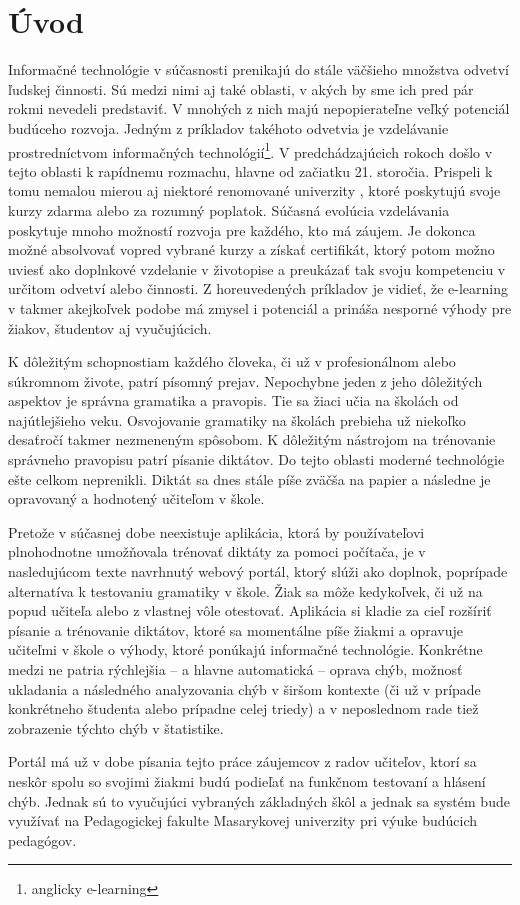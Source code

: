 \documentclass[12pt,oneside]{fithesis2}
\begin{document}
  \MainMatter                     %
\chapter{Úvod}          %
  
  \par Informačné technológie v súčasnosti prenikajú do stále väčšieho množstva odvetví ľudskej činnosti. Sú medzi nimi aj také oblasti, v akých by sme ich pred pár rokmi nevedeli predstaviť. V mnohých z nich majú nepopierateľne veľký potenciál budúceho rozvoja. Jedným z príkladov takéhoto odvetvia je vzdelávanie prostredníctvom informačných technológií\footnote{anglicky e-learning}. V predchádzajúcich rokoch došlo v tejto oblasti k rapídnemu rozmachu, hlavne od začiatku 21. storočia\cite{cross04}. Prispeli k tomu nemalou mierou aj niektoré renomované univerzity \cite{crimson15}, ktoré poskytujú svoje kurzy zdarma alebo za rozumný poplatok. Súčasná evolúcia vzdelávania poskytuje mnoho možností rozvoja pre každého, kto má záujem. Je dokonca možné absolvovať vopred vybrané kurzy a získať certifikát, ktorý potom možno uviesť ako doplnkové vzdelanie v životopise a preukázať tak svoju kompetenciu v určitom odvetví alebo činnosti\cite{coursera15}. Z horeuvedených príkladov je vidieť, že e-learning v takmer akejkoľvek podobe má zmysel i potenciál a prináša nesporné výhody pre žiakov, študentov aj vyučujúcich. 
  \par K dôležitým schopnostiam každého človeka, či už v profesionálnom alebo súkromnom živote, patrí písomný prejav. Nepochybne jeden z jeho dôležitých aspektov je správna gramatika a pravopis. Tie sa žiaci učia na školách od najútlejšieho veku. Osvojovanie gramatiky na školách prebieha už niekoľko desaťročí takmer nezmeneným spôsobom. K dôležitým nástrojom na trénovanie správneho pravopisu patrí písanie diktátov. Do tejto oblasti moderné technológie ešte celkom neprenikli. Diktát sa dnes stále píše zväčša na papier a následne je opravovaný a hodnotený učiteľom v škole.
  \par Pretože v súčasnej dobe neexistuje aplikácia, ktorá by používateľovi plnohodnotne umožňovala trénovať diktáty za pomoci počítača, je v nasledujúcom texte navrhnutý webový portál, ktorý slúži ako doplnok, poprípade alternatíva k testovaniu gramatiky v škole. Žiak sa môže kedykoľvek, či už na popud učiteľa alebo z vlastnej vôle otestovať. Aplikácia si kladie za cieľ rozšíriť písanie a trénovanie diktátov, ktoré sa momentálne píše žiakmi a opravuje učiteľmi v škole o výhody, ktoré ponúkajú informačné technológie. Konkrétne medzi ne patria rýchlejšia -- a hlavne automatická -- oprava chýb, možnosť ukladania a následného analyzovania chýb v širšom kontexte (či už v prípade konkrétneho študenta alebo prípadne celej triedy) a v neposlednom rade tiež zobrazenie týchto chýb v štatistike.
  \par Portál má už v dobe písania tejto práce záujemcov z radov učiteľov, ktorí sa neskôr spolu so svojimi žiakmi budú podieľať na funkčnom testovaní a hlásení chýb. Jednak sú to vyučujúci vybraných základných škôl a jednak sa systém bude využívať na Pedagogickej fakulte Masarykovej univerzity pri výuke budúcich pedagógov.
    
\end{document}
